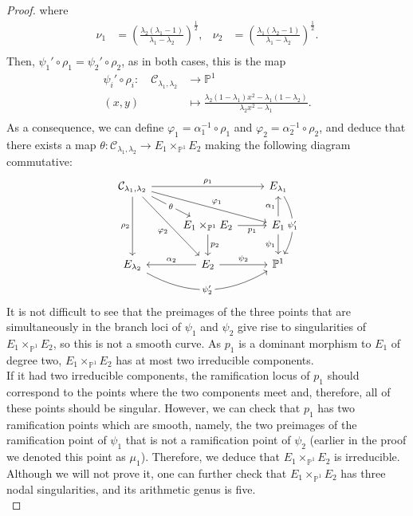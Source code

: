 \documentclass[10pt,a4paper]{amsart}
\newcommand{\calC}{\mathcal{C}}
\begin{document}
\begin{proof}
where
\begin{align*}
\nu_1&=\left(\frac{\lambda_2(\lambda_1-1)}{\lambda_1-\lambda_2}\right)^\frac{1}{2}, & \nu_2&=\left(\frac{\lambda_1(\lambda_2-1)}{\lambda_1-\lambda_2}\right)^\frac{1}{2}.\\
\end{align*}
Then, $\psi_1'\circ\rho_1=\psi_2'\circ\rho_2$, as in both cases, this is the map
\begin{align*}
\psi_i'\circ\rho_i\colon\quad \calC_{\lambda_1,\lambda_2}&\longrightarrow \mathbb{P}^1\\
(x,y)&\longmapsto \frac{\lambda_2(1-\lambda_1)x^2-\lambda_1(1-\lambda_2)}{\lambda_2x^2-\lambda_1}.\\
\end{align*}
As a consequence, we can define  $\varphi_1=\alpha_1^{-1}\circ\rho_1$ and $\varphi_2=\alpha_2^{-1}\circ\rho_2$, and deduce that there exists a map $\theta:\calC_{\lambda_1,\lambda_2}\rightarrow E_1\times_{\mathbb{P}^1}E_2$ making the following diagram commutative:
\[
\begin{tikzcd}
\calC_{\lambda_1,\lambda_2} \arrow[rd, "\theta" description] \arrow[rrd, "\varphi_1"] \arrow[rdd, "\varphi_2"'] \arrow[rr, "\rho_1"] \arrow[dd, "\rho_2"'] &                                                                & E_{\lambda_1} \arrow[dd, "\psi_1'" description, bend left] \\
                                                                                                                                        & E_1\times_{\mathbb{P}^1}E_2 \arrow[r, "p_1"'] \arrow[d, "p_2"] & E_1 \arrow[d, "\psi_1"'] \arrow[u, "\alpha_1"]               \\
E_{\lambda_2} \arrow[rr, "\psi_2'" description, bend right]                                                                             & E_2 \arrow[r, "\psi_2"] \arrow[l, "\alpha_2"']                   & \mathbb{P}^1                                              
\end{tikzcd}\vspace{10pt}
\]
It is not difficult to see that the preimages of the three points that are simultaneously in the branch loci of $\psi_1$ and $\psi_2$ give rise to singularities of $E_1\times_{\mathbb{P}^1}E_2$, so this is not a smooth curve. As $p_1$ is a dominant morphism to $E_1$ of degree two, $E_1\times_{\mathbb{P}^1}E_2$ has at most two irreducible components.\\

If it had two irreducible components, the ramification locus of $p_1$ should correspond to the points where the two components meet and, therefore, all of these points should be singular. However, we can check that $p_1$ has two ramification points which are smooth, namely, the two preimages of the ramification point of $\psi_1$ that is not a ramification point of $\psi_2$ (earlier in the proof we denoted this point as $\mu_1$). Therefore, we deduce that $E_1\times_{\mathbb{P}^1}E_2$ is irreducible. Although we will not prove it, one can further check that $E_1\times_{\mathbb{P}^1}E_2$ has three nodal singularities, and its arithmetic genus is five.\\


\end{proof}
\end{document}
